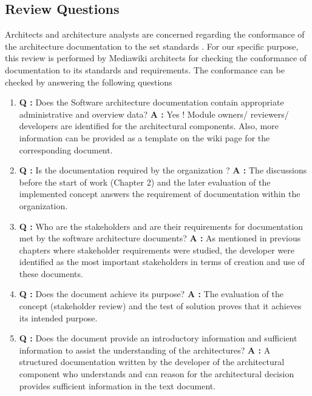 \subsection{Review Questions}
Architects and architecture analysts are concerned regarding the conformance of the architecture documentation to the set standards \cite{BachmannDocumentingSoftware2010}. For our specific purpose, this review is performed by Mediawiki architects for checking the conformance of documentation to its standards and requirements. The conformance can be checked by answering the following questions\cite{BachmannDocumentingSoftware2010}
\begin{enumerate}
\item \textbf{Q : }Does the Software architecture documentation contain appropriate administrative and overview data?
\newline
\textbf{A : } Yes ! Module owners/ reviewers/ developers are identified for the architectural components. Also, more information can be provided as a template on the wiki page for the corresponding document. 
\item \textbf{Q : }Is the documentation required by the organization ?
\newline
\textbf{A : }The discussions before the start of work (Chapter 2) and the later evaluation of the implemented concept answers the requirement of documentation within the organization.
\item \textbf{Q : }Who are the stakeholders and are their requirements for documentation met by the software architecture documents?
\newline
\textbf{A : }As mentioned in previous chapters where stakeholder requirements were studied, the developer were identified as the most important stakeholders in terms of creation and use of these documents.
\item \textbf{Q : }Does the document achieve its purpose?
\newline 
\textbf{A : }The evaluation of the concept (stakeholder review) and the test of solution proves that it achieves its intended purpose.
\item \textbf{Q : }Does the document provide an introductory information and sufficient information to assist the understanding of the architectures?
\newline
\textbf{A : } A structured documentation written by the developer of the architectural component who understands and can reason for the architectural decision provides sufficient information in the text document. 
\end{enumerate}
